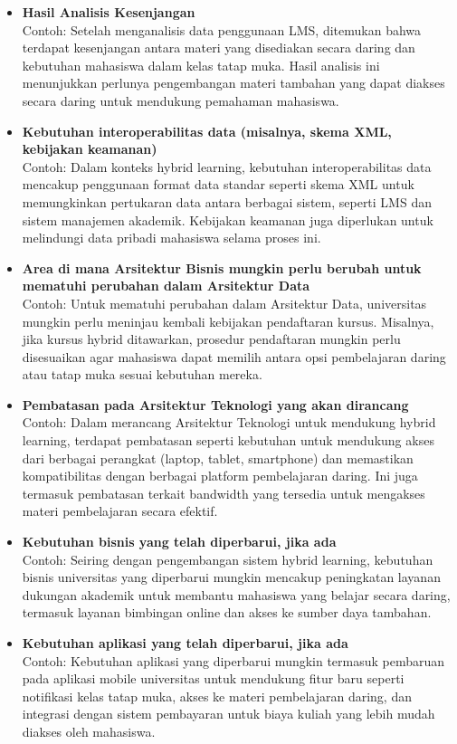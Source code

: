 \begin{itemize}
	\item \textbf{Hasil Analisis Kesenjangan} \\
	Contoh: Setelah menganalisis data penggunaan LMS, ditemukan bahwa terdapat kesenjangan antara materi yang disediakan secara daring dan kebutuhan mahasiswa dalam kelas tatap muka. Hasil analisis ini menunjukkan perlunya pengembangan materi tambahan yang dapat diakses secara daring untuk mendukung pemahaman mahasiswa.
	
	\item \textbf{Kebutuhan interoperabilitas data (misalnya, skema XML, kebijakan keamanan)} \\
	Contoh: Dalam konteks hybrid learning, kebutuhan interoperabilitas data mencakup penggunaan format data standar seperti skema XML untuk memungkinkan pertukaran data antara berbagai sistem, seperti LMS dan sistem manajemen akademik. Kebijakan keamanan juga diperlukan untuk melindungi data pribadi mahasiswa selama proses ini.
	
	\item \textbf{Area di mana Arsitektur Bisnis mungkin perlu berubah untuk mematuhi perubahan dalam Arsitektur Data} \\
	Contoh: Untuk mematuhi perubahan dalam Arsitektur Data, universitas mungkin perlu meninjau kembali kebijakan pendaftaran kursus. Misalnya, jika kursus hybrid ditawarkan, prosedur pendaftaran mungkin perlu disesuaikan agar mahasiswa dapat memilih antara opsi pembelajaran daring atau tatap muka sesuai kebutuhan mereka.
	
	\item \textbf{Pembatasan pada Arsitektur Teknologi yang akan dirancang} \\
	Contoh: Dalam merancang Arsitektur Teknologi untuk mendukung hybrid learning, terdapat pembatasan seperti kebutuhan untuk mendukung akses dari berbagai perangkat (laptop, tablet, smartphone) dan memastikan kompatibilitas dengan berbagai platform pembelajaran daring. Ini juga termasuk pembatasan terkait bandwidth yang tersedia untuk mengakses materi pembelajaran secara efektif.
	
	\item \textbf{Kebutuhan bisnis yang telah diperbarui, jika ada} \\
	Contoh: Seiring dengan pengembangan sistem hybrid learning, kebutuhan bisnis universitas yang diperbarui mungkin mencakup peningkatan layanan dukungan akademik untuk membantu mahasiswa yang belajar secara daring, termasuk layanan bimbingan online dan akses ke sumber daya tambahan.
	
	\item \textbf{Kebutuhan aplikasi yang telah diperbarui, jika ada} \\
	Contoh: Kebutuhan aplikasi yang diperbarui mungkin termasuk pembaruan pada aplikasi mobile universitas untuk mendukung fitur baru seperti notifikasi kelas tatap muka, akses ke materi pembelajaran daring, dan integrasi dengan sistem pembayaran untuk biaya kuliah yang lebih mudah diakses oleh mahasiswa.
\end{itemize}

